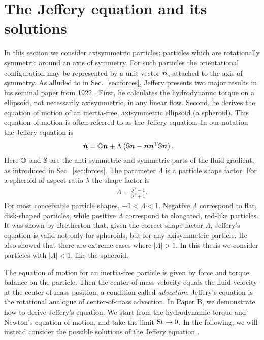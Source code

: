 \documentclass[thesis.tex]{subfiles}
\begin{document}
\section{The Jeffery equation and its solutions}\label{sec:jefferyequation}

In this section we consider axisymmetric particles: particles which are rotationally symmetric around an axis of symmetry. For such particles the orientational configuration may be represented by a unit vector $\mbox{\boldmath$n$}$, attached to the axis of symmetry. As alluded to in Sec.~\ref{sec:forces}, Jeffery presents two major results in his seminal paper from 1922 \cite{jeffery1922}. First, he calculates the hydrodynamic torque on a ellipsoid, not necessarily axisymmetric, in any linear flow. Second, he derives the equation of motion of an inertia-free, axisymmetric ellipsoid (a spheroid). This equation of motion is often referred to as the Jeffery equation. In our notation the Jeffery equation is
\begin{align}
	\dot{\ve n} &= \ma O \ve n + \Lambda \left(\ma S \ve n - \ve n \ve n \transpose \ma S \ve n\right).\eqnlab{jeffery}
\end{align}
Here $\mathbb{O}$ and $\mathbb{S}$ are the anti-symmetric and symmetric parts of the fluid gradient, as introduced in Sec.~\ref{sec:forces}. The parameter $\Lambda$ is a particle shape factor. For a spheroid of aspect ratio $\lambda$ the shape factor is
\begin{align*}
	\Lambda = \frac{\lambda^2-1}{\lambda^2+1}.
\end{align*}
For most conceivable particle shapes, $-1 < \Lambda < 1$. Negative $\Lambda$ correspond to flat, disk-shaped particles, while positive $\Lambda$ correspond to elongated, rod-like particles. It was shown by Bretherton \cite{bretherton1962} that, given the correct shape factor $\Lambda$, Jeffery's equation is valid not only for spheroids, but for any axisymmetric particle. He also showed that there are extreme cases where $|\Lambda|>1$. In this thesis we consider particles with $|\Lambda|<1$, like the spheroid.

 The equation of motion for an inertia-free particle is given by force and torque balance on the particle. Then the center-of-mass velocity equals the fluid velocity at the center-of-mass position, a condition called \emph{advection}. Jeffery's equation is the rotational analogue of center-of-mass advection. In Paper B, we demonstrate how to derive Jeffery's equation. We start from the hydrodynamic torque and Newton's equation of motion, and take the limit $\mbox{St}\to 0$. In the following, we will instead consider the possible solutions of the Jeffery equation .
\end{document}
